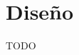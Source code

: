\documentclass[letterpaper,10pt]{article}
\begin{document}
	\newpage

	\section{Diseño}

	TODO
	
\end{document}
